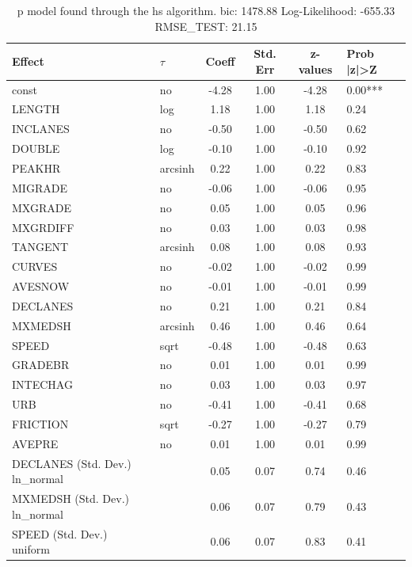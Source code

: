 \begin{table}
	\caption{p model found through the hs algorithm. bic: 1478.88 Log-Likelihood: -655.33 RMSE_TEST: 21.15}
	\begin{center}
		\begin{tabular}{|l|l|c|c|c|l|}
			\hline
			Effect & $\tau$ & Coeff & Std. Err & z-values & Prob |z|>Z \\
			\hline
			const & no & -4.28 & 1.00 & -4.28 & 0.00*** \\
			\hline
			LENGTH & log & 1.18 & 1.00 & 1.18 & 0.24 \\
			\hline
			INCLANES & no & -0.50 & 1.00 & -0.50 & 0.62 \\
			\hline
			DOUBLE & log & -0.10 & 1.00 & -0.10 & 0.92 \\
			\hline
			PEAKHR & arcsinh & 0.22 & 1.00 & 0.22 & 0.83 \\
			\hline
			MIGRADE & no & -0.06 & 1.00 & -0.06 & 0.95 \\
			\hline
			MXGRADE & no & 0.05 & 1.00 & 0.05 & 0.96 \\
			\hline
			MXGRDIFF & no & 0.03 & 1.00 & 0.03 & 0.98 \\
			\hline
			TANGENT & arcsinh & 0.08 & 1.00 & 0.08 & 0.93 \\
			\hline
			CURVES & no & -0.02 & 1.00 & -0.02 & 0.99 \\
			\hline
			AVESNOW & no & -0.01 & 1.00 & -0.01 & 0.99 \\
			\hline
			DECLANES & no & 0.21 & 1.00 & 0.21 & 0.84 \\
			\hline
			MXMEDSH & arcsinh & 0.46 & 1.00 & 0.46 & 0.64 \\
			\hline
			SPEED & sqrt & -0.48 & 1.00 & -0.48 & 0.63 \\
			\hline
			GRADEBR & no & 0.01 & 1.00 & 0.01 & 0.99 \\
			\hline
			INTECHAG & no & 0.03 & 1.00 & 0.03 & 0.97 \\
			\hline
			URB & no & -0.41 & 1.00 & -0.41 & 0.68 \\
			\hline
			FRICTION & sqrt & -0.27 & 1.00 & -0.27 & 0.79 \\
			\hline
			AVEPRE & no & 0.01 & 1.00 & 0.01 & 0.99 \\
			\hline
			DECLANES (Std. Dev.) ln_normal &  & 0.05 & 0.07 & 0.74 & 0.46 \\
			\hline
			MXMEDSH (Std. Dev.) ln_normal &  & 0.06 & 0.07 & 0.79 & 0.43 \\
			\hline
			SPEED (Std. Dev.) uniform &  & 0.06 & 0.07 & 0.83 & 0.41 \\

\end{tabular}
\end{center}
\end{table}
